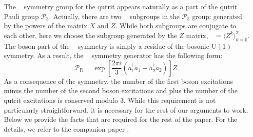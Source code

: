 \documentclass[reprint, aps, prx, amsmath, amssymb, longbibliography, superscriptaddress]{revtex4-2}
\DeclareMathOperator{\Zthree}{\mathbb{Z}_3}
\begin{document}
The $\Zthree$ symmetry group for the qutrit appears naturally as a part of the qutrit Pauli group $\mathcal{P}_3$. Actually, there are two $\Zthree$ subgroups in the $\mathcal{P}_3$ group: generated by the powers of the matrix $X$ and $Z$. While both subgroups are conjugate to each other, here we choose the subgroup generated by the $Z$ matrix, $\Zthree = \langle Z^k \rangle_{k=0}^2$. The boson part of the $\Zthree$ symmetry is simply a residue of the bosonic $\mathrm{U(1)}$ symmetry. As a result, the $\Zthree$ symmetry generator has the following form:
\begin{equation}
     \mathcal{P}_{\text{R}} = \exp\left[\frac{2\pi i}{3}(a_1^{\dagger}  a_1 -  a_2^{\dagger}  a_2)\right] Z.
\end{equation}
As a consequence of the symmetry, the number of the first boson excitations minus the number of the second boson excitations and plus the number of the qutrit excitations is conserved modulo 3. While this requirement is not particularly straightforward, it is necessary for the rest of our arguments to work. Below we provide the facts that are required for the rest of the paper. For the details, we refer to the companion paper \cite{lotkov_cat_}.
\end{document}
